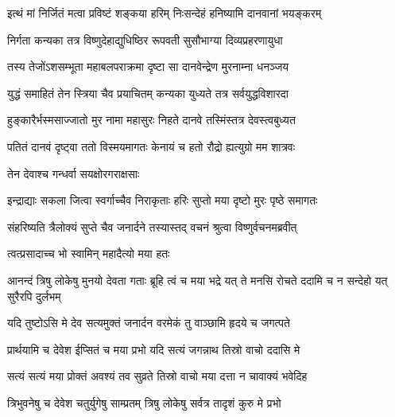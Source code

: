 \twolineshloka
{इत्थं मां निर्जितं मत्वा प्रविष्टं शङ्कया हरिम्}
{निःसन्देहं हनिष्यामि दानवानां भयङ्करम्}%

\twolineshloka
{निर्गता कन्यका तत्र विष्णुदेहाद्युधिष्ठिर}
{रूपवती सुसौभाग्या दिव्यप्रहरणायुधा}%

\twolineshloka
{तस्य तेजोंऽशसम्भूता महाबलपराक्रमा}
{दृष्टा सा दानवेन्द्रेण मुरनाम्ना धनञ्जय}%

\twolineshloka
{युद्धं समाहितं तेन स्त्रिया चैव प्रयाचितम्}
{कन्यका युध्यते तत्र सर्वयुद्धविशारदा}%

\twolineshloka
{हुङ्कारैर्भस्मसाज्जातो मुर नामा महासुरः}
{निहते दानवे तस्मिंस्तत्र देवस्त्वबुध्यत}%

\twolineshloka
{पतितं दानवं दृष्ट्वा ततो विस्मयमागतः}
{केनायं च हतो रौद्रो ह्यत्युग्रो मम शात्रवः}%


\onelineshloka
{तेन देवाश्च गन्धर्वा सयक्षोरगराक्षसाः}%

\twolineshloka
{इन्द्राद्याः सकला जित्वा स्वर्गाच्चैव निराकृताः}
{हरिः सुप्तो मया दृष्टो मुरः पृष्ठे समागतः}%

\twolineshloka
{संहरिष्यति त्रैलोक्यं सुप्ते चैव जनार्दने}
{तस्यास्तद् वचनं श्रुत्वा विष्णुर्वचनमब्रवीत्}%

\onelineshloka
{त्वत्प्रसादाच्च भो स्वामिन् महादैत्यो मया हतः}%


\threelineshloka
{आनन्दं त्रिषु लोकेषु मुनयो देवता गताः}
{ब्रूहि त्वं च मया भद्रे यत् ते मनसि रोचते}
{ददामि च न सन्देहो यत् सुरैरपि दुर्लभम्}%


\twolineshloka
{यदि तुष्टोऽसि मे देव सत्यमुक्तं जनार्दन}
{वरमेकं तु वाञ्छामि हृदये च जगत्पते}%

\twolineshloka
{प्रार्थयामि च देवेश ईप्सितं च मया प्रभो}
{यदि सत्यं जगन्नाथ तिस्रो वाचो ददासि मे}%


\twolineshloka
{सत्यं सत्यं मया प्रोक्तं अवश्यं तव सुव्रते}
{तिस्रो वाचो मया दत्ता न चावाक्यं भवेदिह}%


\twolineshloka
{त्रिभुवनेषु च देवेश चतुर्युगेषु साम्प्रतम्}
{त्रिषु लोकेषु सर्वत्र तादृशं कुरु मे प्रभो}%

